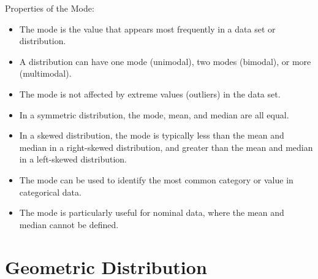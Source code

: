 \documentclass[openany]{book}
\begin{document}
\begin{mynote}
    Properties of the Mode:
    \begin{itemize}
        \item The mode is the value that appears most frequently in a data set or distribution.
        \item A distribution can have one mode (unimodal), two modes (bimodal), or more (multimodal).
        \item The mode is not affected by extreme values (outliers) in the data set.
        \item In a symmetric distribution, the mode, mean, and median are all equal.
        \item In a skewed distribution, the mode is typically less than the mean and median in a right-skewed distribution, and greater than the mean and median in a left-skewed distribution.
        \item The mode can be used to identify the most common category or value in categorical data.
        \item The mode is particularly useful for nominal data, where the mean and median cannot be defined.
    \end{itemize}
\end{mynote}
\section{Geometric Distribution}
\end{document}

